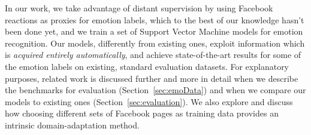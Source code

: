 \documentclass[11pt]{article}
\begin{document}

In our work, we take advantage of distant supervision by using Facebook reactions as proxies for emotion labels, which to the best of our knowledge hasn't been done yet, and we train a set of Support Vector Machine models for emotion recognition. Our models, differently from existing ones, exploit information which is \textit{acquired entirely automatically}, and achieve state-of-the-art results for some of the emotion labels on existing, standard evaluation datasets. For explanatory purposes, related work is discussed further and more in detail when we describe the benchmarks for evaluation (Section~\ref{sec:emoData}) and when we compare our models to existing ones (Section~\ref{sec:evaluation}). We also explore and discuss how choosing different sets of Facebook pages as training data provides an intrinsic domain-adaptation method.



%


%



%
\end{document}
